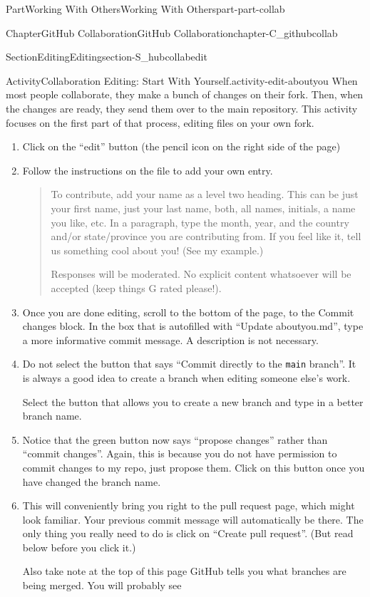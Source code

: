 \documentclass[oneside,10pt,]{book}
\newcommand{\mono}[1]{\texttt{#1}}
\begin{document}
\begin{partptx}{Part}{Working With Others}{}{Working With Others}{}{}{part-part-collab}
\begin{chapterptx}{Chapter}{GitHub Collaboration}{}{GitHub Collaboration}{}{}{chapter-C_githubcollab}
\begin{sectionptx}{Section}{Editing}{}{Editing}{}{}{section-S_hubcollabedit}
\begin{activity}{Activity}{Collaboration Editing: Start With Yourself.}{activity-edit-aboutyou}
When most people collaborate, they make a bunch of changes on their fork. Then, when the changes are ready, they send them over to the main repository. This activity focuses on the first part of that process, editing files on your own fork.%
\begin{enumerate}[font=\bfseries,label=(\alph*),ref=\alph*]%
\item{}Click on the ``edit'' button (the pencil icon on the right side of the page)%
\item{}Follow the instructions on the file to add your own entry.%
\begin{quote}%
To contribute, add your name as a level two heading. This can be just your first name, just your last name, both, all names, initials, a name you like, etc. In a paragraph, type the month, year, and the country and\slash{}or state\slash{}province you are contributing from. If you feel like it, tell us something cool about you! (See my example.)%
\par
Responses will be moderated. No explicit content whatsoever will be accepted (keep things G rated please!).%
\end{quote}
\item{}Once you are done editing, scroll to the bottom of the page, to the Commit changes block. In the box that is autofilled with ``Update aboutyou.md'', type a more informative commit message. A description is not necessary.%
\item{}Do not select the button that says ``Commit directly to the \mono{main} branch''. It is always a good idea to create a branch when editing someone else's work.%
\par
Select the button that allows you to create a new branch and type in a better branch name.%
\item{}Notice that the green button now says ``propose changes'' rather than ``commit changes''. Again, this is because you do not have permission to commit changes to my repo, just propose them. Click on this button once you have changed the branch name.%
\item{}This will conveniently bring you right to the pull request page, which might look familiar. Your previous commit message will automatically be there. The only thing you really need to do is click on ``Create pull request''. (But read below before you click it.)%
\par
Also take note at the top of this page GitHub tells you what branches are being merged. You will probably see%
\begin{quote}%

\end{quote}
\end{enumerate}
\end{activity}
\end{sectionptx}
\end{chapterptx}
\end{partptx}
\end{document}
